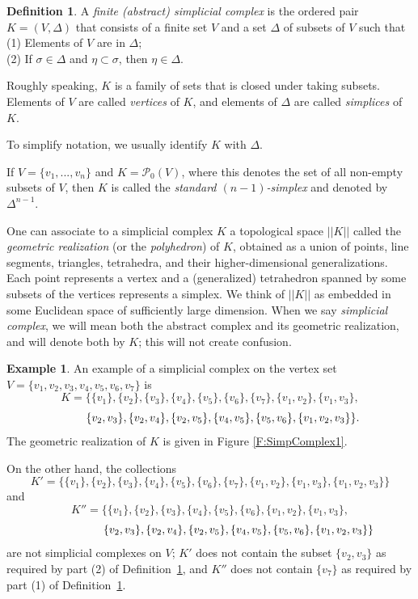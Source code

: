 \documentclass[11pt]{amsart}
\theoremstyle{plain}
\theoremstyle{definition}
\newtheorem{defin}[thm]{Definition}
\newtheorem{example}[thm]{Example}
\theoremstyle{remark}
\newcommand{\refD}[1]{Definition~\ref{D:#1}}
\begin{document}
\begin{defin}\label{D:SC}
A \emph{finite (abstract) simplicial complex} is the ordered pair $K=(V,\Delta)$ that consists of a finite set $V$ and a set $\Delta$ of subsets of $V$ such that\\
\hspace*{1cm}(1) Elements of $V$ are in $\Delta$;\\
\hspace*{1cm}(2) If $\sigma \in \Delta$ and $\eta \subset \sigma$, then $\eta \in \Delta$.
\end{defin}
Roughly speaking, $K$ is a family of sets that is closed under taking subsets. Elements of $V$ are called \textit{vertices} of $K$, and elements of $\Delta$ are called \textit{simplices} of $K$.

To simplify notation, we usually identify $K$ with $\Delta$.

If $V=\{v_1, ..., v_n\}$ and $K=\mathcal P_0(V)$, where this denotes the set of all non-empty subsets of $V$, then $K$ is called the \emph{standard $(n-1)$-simplex} and denoted by $\Delta^{n-1}$.

One can associate to a simplicial complex $K$ a topological space $|\!|K|\!|$ called the \emph{geometric realization} (or the \emph{polyhedron}) of $K$, obtained as a union of points, line segments, triangles, tetrahedra, and their higher-dimensional generalizations. Each point represents a vertex and a (generalized) tetrahedron spanned by some subsets of the vertices represents a simplex. We think of $|\!|K|\!|$ as embedded in some Euclidean space of sufficiently large dimension. When we say \textit{simplicial complex}, we will mean both the abstract complex and its geometric realization, and will denote both by $K$; this will not create confusion.


\begin{example}\label{E:complex1}
An example of a simplicial complex on the vertex set $V=\{v_1, v_2, v_3, v_4, v_5, v_6, v_7\}$ is 
$$K=\{\{v_1\}, \{v_2\}, \{v_3\}, \{v_4\}, \{v_5\}, \{v_6\}, \{v_7\}, \{v_1, v_2\}, \{v_1, v_3\},$$
$$\hspace{0.78cm}\{v_2, v_3\}, \{v_2, v_4\}, \{v_2, v_5\}, \{v_4, v_5\}, \{v_5, v_6\}, \{v_1, v_2, v_3\}\}.$$
The geometric realization of $K$ is given in Figure \ref{F:SimpComplex1}.


On the other hand, the collections 
$$K'=\{\{v_1\}, \{v_2\}, \{v_3\}, \{v_4\}, \{v_5\}, \{v_6\}, \{v_7\}, \{v_1, v_2\}, \{v_1, v_3\}, \{v_1, v_2, v_3\}\}$$
and
$$K''=\{\{v_1\}, \{v_2\}, \{v_3\}, \{v_4\}, \{v_5\}, \{v_6\}, \{v_1, v_2\}, \{v_1, v_3\}, $$
$$\hspace{1.78cm}\{v_2, v_3\}, \{v_2, v_4\}, \{v_2, v_5\}, \{v_4, v_5\}, \{v_5, v_6\}, \{v_1, v_2, v_3\}\}$$
are not simplicial complexes on $V$; $K'$ does not contain the subset $\{v_2,v_3\}$ as required by part (2) of \refD{SC}, and $K''$ does not contain $\{v_7\}$ as required by part (1) of \refD{SC}.
\end{example}
\end{document}
